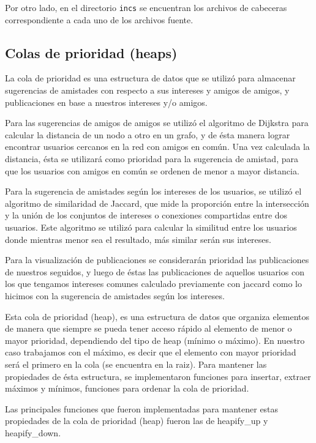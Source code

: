 \documentclass[9pt,letterpaper,onecolumn]{rho-class/rho}
\begin{document}
    Por otro lado, en el directorio \texttt{incs} se encuentran los archivos de cabeceras correspondiente a cada uno de los archivos fuente.

    \subsection{Colas de prioridad (heaps)}
    La cola de prioridad es una estructura de datos que se utilizó para almacenar sugerencias de amistades con respecto a sus intereses y amigos de amigos, y publicaciones en base a nuestros intereses y/o amigos.

    Para las sugerencias de amigos de amigos se utilizó el algoritmo de Dijkstra para calcular la distancia de un nodo a otro en un grafo, y de ésta manera lograr encontrar usuarios cercanos en la red con amigos en común. Una vez calculada la distancia, ésta se utilizará como prioridad para la sugerencia de amistad, para que los usuarios con amigos en común se ordenen de menor a mayor distancia.

    Para la sugerencia de amistades según los intereses de los usuarios, se utilizó el algoritmo de similaridad de Jaccard, que mide la proporción entre la intersección y la unión de los conjuntos de intereses o conexiones compartidas entre dos usuarios. Este algoritmo se utilizó para calcular la similitud entre los usuarios donde mientras menor sea el resultado, más similar serán sus intereses.

    Para la visualización de publicaciones se considerarán prioridad las publicaciones de nuestros seguidos, y luego de éstas las publicaciones de aquellos usuarios con los que tengamos intereses comunes calculado previamente con jaccard como lo hicimos con la sugerencia de amistades según los intereses.

    Esta cola de prioridad (heap), es una estructura de datos que organiza elementos de manera que siempre se pueda tener acceso rápido al elemento de menor o mayor prioridad, dependiendo del tipo de heap (mínimo o máximo). En nuestro caso trabajamos con el máximo, es decir que el elemento con mayor prioridad será el primero en la cola (se encuentra en la raiz). Para mantener las propiedades de ésta estructura, se implementaron funciones para insertar, extraer máximos y mínimos, funciones para ordenar la cola de prioridad.

    Las principales funciones que fueron implementadas para mantener estas propiedades de la cola de prioridad (heap) fueron las de heapify\_up y heapify\_down.
\end{document}
